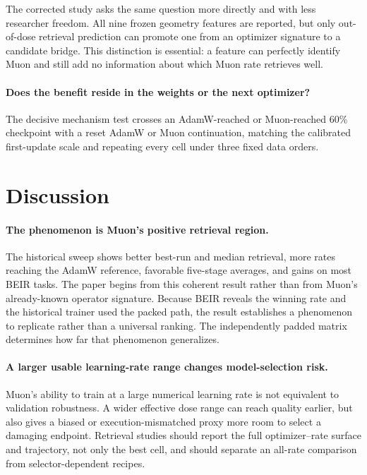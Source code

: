 \documentclass[11pt]{article}
\begin{document}
\CausalChainSummaryTable

The corrected study asks the same question more directly and with less researcher freedom. All nine
frozen geometry features are reported, but only out-of-dose retrieval prediction can promote one
from an optimizer signature to a candidate bridge. This distinction is essential: a feature can
perfectly identify Muon and still add no information about which Muon rate retrieves well.

\paragraph{Does the benefit reside in the weights or the next optimizer?}
The decisive mechanism test crosses an AdamW-reached or Muon-reached 60\% checkpoint with a reset
AdamW or Muon continuation, matching the calibrated first-update scale and repeating every cell
under three fixed data orders. \StateOperatorMechanismFinding

\section{Discussion}

\paragraph{The phenomenon is Muon's positive retrieval region.}
The historical sweep shows better best-run and median retrieval, more rates reaching the AdamW
reference, favorable five-stage averages, and gains on most BEIR tasks. The paper begins from this
coherent result rather than from Muon's already-known operator signature. Because BEIR reveals the
winning rate and the historical trainer used the packed path, the result establishes a phenomenon
to replicate rather than a universal ranking. The independently padded matrix determines how far
that phenomenon generalizes.

\paragraph{A larger usable learning-rate range changes model-selection risk.}
Muon's ability to train at a large numerical learning rate is not equivalent to validation
robustness. A wider effective dose range can reach quality earlier, but also gives a biased or
execution-mismatched proxy more room to select a damaging endpoint. Retrieval studies should report
the full optimizer--rate surface and trajectory, not only the best cell, and should separate an
all-rate comparison from selector-dependent recipes.
\end{document}
